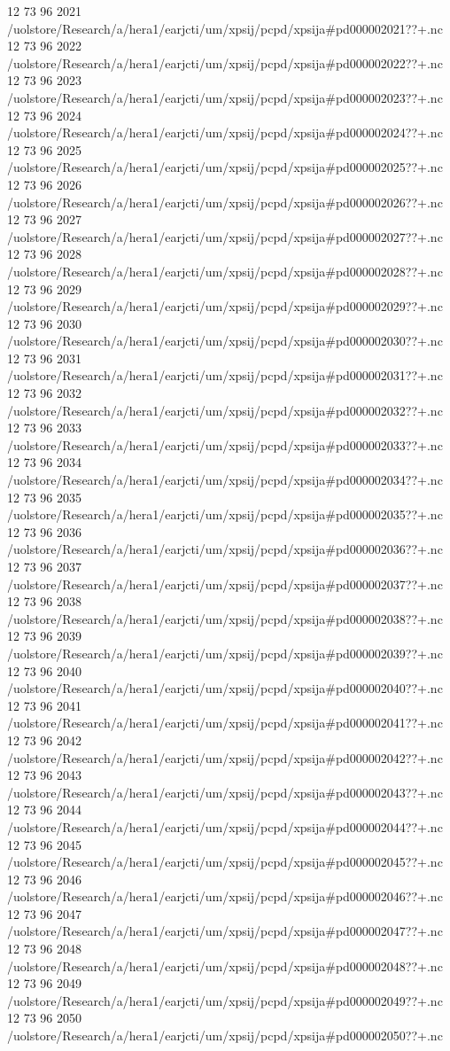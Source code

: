 12 73 96
2021
/uolstore/Research/a/hera1/earjcti/um/xpsij/pcpd/xpsija#pd000002021??+.nc
12 73 96
2022
/uolstore/Research/a/hera1/earjcti/um/xpsij/pcpd/xpsija#pd000002022??+.nc
12 73 96
2023
/uolstore/Research/a/hera1/earjcti/um/xpsij/pcpd/xpsija#pd000002023??+.nc
12 73 96
2024
/uolstore/Research/a/hera1/earjcti/um/xpsij/pcpd/xpsija#pd000002024??+.nc
12 73 96
2025
/uolstore/Research/a/hera1/earjcti/um/xpsij/pcpd/xpsija#pd000002025??+.nc
12 73 96
2026
/uolstore/Research/a/hera1/earjcti/um/xpsij/pcpd/xpsija#pd000002026??+.nc
12 73 96
2027
/uolstore/Research/a/hera1/earjcti/um/xpsij/pcpd/xpsija#pd000002027??+.nc
12 73 96
2028
/uolstore/Research/a/hera1/earjcti/um/xpsij/pcpd/xpsija#pd000002028??+.nc
12 73 96
2029
/uolstore/Research/a/hera1/earjcti/um/xpsij/pcpd/xpsija#pd000002029??+.nc
12 73 96
2030
/uolstore/Research/a/hera1/earjcti/um/xpsij/pcpd/xpsija#pd000002030??+.nc
12 73 96
2031
/uolstore/Research/a/hera1/earjcti/um/xpsij/pcpd/xpsija#pd000002031??+.nc
12 73 96
2032
/uolstore/Research/a/hera1/earjcti/um/xpsij/pcpd/xpsija#pd000002032??+.nc
12 73 96
2033
/uolstore/Research/a/hera1/earjcti/um/xpsij/pcpd/xpsija#pd000002033??+.nc
12 73 96
2034
/uolstore/Research/a/hera1/earjcti/um/xpsij/pcpd/xpsija#pd000002034??+.nc
12 73 96
2035
/uolstore/Research/a/hera1/earjcti/um/xpsij/pcpd/xpsija#pd000002035??+.nc
12 73 96
2036
/uolstore/Research/a/hera1/earjcti/um/xpsij/pcpd/xpsija#pd000002036??+.nc
12 73 96
2037
/uolstore/Research/a/hera1/earjcti/um/xpsij/pcpd/xpsija#pd000002037??+.nc
12 73 96
2038
/uolstore/Research/a/hera1/earjcti/um/xpsij/pcpd/xpsija#pd000002038??+.nc
12 73 96
2039
/uolstore/Research/a/hera1/earjcti/um/xpsij/pcpd/xpsija#pd000002039??+.nc
12 73 96
2040
/uolstore/Research/a/hera1/earjcti/um/xpsij/pcpd/xpsija#pd000002040??+.nc
12 73 96
2041
/uolstore/Research/a/hera1/earjcti/um/xpsij/pcpd/xpsija#pd000002041??+.nc
12 73 96
2042
/uolstore/Research/a/hera1/earjcti/um/xpsij/pcpd/xpsija#pd000002042??+.nc
12 73 96
2043
/uolstore/Research/a/hera1/earjcti/um/xpsij/pcpd/xpsija#pd000002043??+.nc
12 73 96
2044
/uolstore/Research/a/hera1/earjcti/um/xpsij/pcpd/xpsija#pd000002044??+.nc
12 73 96
2045
/uolstore/Research/a/hera1/earjcti/um/xpsij/pcpd/xpsija#pd000002045??+.nc
12 73 96
2046
/uolstore/Research/a/hera1/earjcti/um/xpsij/pcpd/xpsija#pd000002046??+.nc
12 73 96
2047
/uolstore/Research/a/hera1/earjcti/um/xpsij/pcpd/xpsija#pd000002047??+.nc
12 73 96
2048
/uolstore/Research/a/hera1/earjcti/um/xpsij/pcpd/xpsija#pd000002048??+.nc
12 73 96
2049
/uolstore/Research/a/hera1/earjcti/um/xpsij/pcpd/xpsija#pd000002049??+.nc
12 73 96
2050
/uolstore/Research/a/hera1/earjcti/um/xpsij/pcpd/xpsija#pd000002050??+.nc
